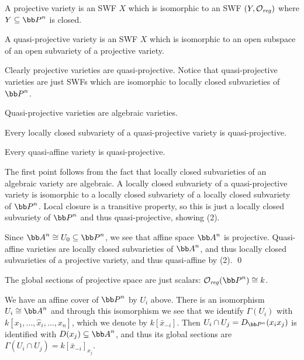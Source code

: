 \eproof

\bdefn

    A {\emphcolor projective variety} is an SWF $X$ which is isomorphic to an SWF $(Y,{{\cal O}}_{\it reg})$ where $Y\subseteq\bP^n$ is closed.

    A {\emphcolor quasi-projective variety} is an SWF $X$ which is isomorphic to an open subspace of an open subvariety of a projective variety.

\edefn

Clearly projective varieties are quasi-projective.
Notice that quasi-projective varieties are just SWFs which are isomorphic to locally closed subvarieties of $\bP^n$.

\bcoro

    \benum
        \item Quasi-projective varieties are algebraic varieties.
        \item Every locally closed subvariety of a quasi-projective variety is quasi-projective.
        \item Every quasi-affine variety is quasi-projective.
    \eenum

\ecoro

\bproof

    The first point follows from the fact that locally closed subvarieties of an algebraic variety are algebraic.
    A locally closed subvariety of a quasi-projective variety is isomorphic to a locally closed subvariety of a locally closed subvariety of $\bP^n$.
    Local closure is a transitive property, so this is just a locally closed subvariety of $\bP^n$ and thus quasi-projective, showing (2).

    Since $\bA^n\cong U_0\subseteq\bP^n$, we see that affine space $\bA^n$ is projective.
    Quasi-affine varieties are locally closed subvarieties of $\bA^n$, and thus locally closed subvarieties of a projective variety, and thus quasi-affine by (2).
    \qed

\eproof

\bprop

    The global sections of projective space are just scalars: $\O_\reg(\bP^n)\cong k$.

\eprop

\bproof

    We have an affine cover of $\bP^n$ by $U_i$ above.
    There is an isomorphism $U_i\cong\bA^n$ and through this isomorphism we see that we identify $\Gamma(U_i)$ with $k[x_1,\dots,\hat x_i,\dots,x_n]$, which we denote by $k[\bar x_{-i}]$.
    Then $U_i\cap U_j=D_{\bP^n}(x_ix_j)$ is identified with $D(x_j)\subseteq\bA^n$, and thus its global sections are $\Gamma(U_i\cap U_j)=k[\bar x_{-i}]_{x_j}$.

